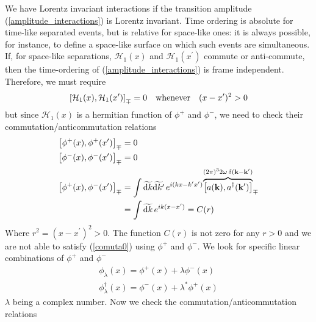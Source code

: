 We have Lorentz invariant interactions if the transition amplitude (\ref{amplitude_interactions}) is Lorentz invariant. Time ordering is absolute for time-like separated events, but is relative for space-like ones: it is always possible, for instance, to define a space-like surface on which such events are simultaneous. If, for space-like separations, $\mathcal{H}_1(x)$ and $\mathcal{H}_1(x^\prime)$ commute or anti-commute, then the time-ordering of (\ref{amplitude_interactions}) is frame independent. Therefore, we must require
\begin{equation}
    \comm{\mathcal{H}_1(x)}{\mathcal{H}_1(x^\prime)}_{\mp}= 0 \quad \text{whenever}\quad (x-x^\prime)^2>0
    \label{comuta0}
\end{equation}
but since $\mathcal{H}_1(x)$ is a hermitian function of $\phi^+$ and $\phi^-$, we need to check their commutation/anticommutation relations
\begin{equation}
    \begin{aligned}
        \comm{\phi^+(x)}{\phi^+(x^\prime)}_{\mp} &=0\\
        \comm{\phi^-(x)}{\phi^-(x^\prime)}_{\mp} &=0\\
        \comm{\phi^+(x)}{\phi^-(x^\prime)}_{\mp} &=\int\widetilde{\dd k}\widetilde{\dd k^\prime}\,e^{i(kx-k^\prime x^\prime)}{\overbrace{\comm{a(\vb{k})}{a^\dagger(\vb{k}^\prime)}}^{(2\pi)^32\omega\,\delta(\vb{k}-\vb{k}^\prime)}}_{\mp}\\
        &=\int\widetilde{\dd k}\,e^{ik(x-x^\prime)}=C(r)
    \end{aligned}
\end{equation}
Where $r^2=(x-x^\prime)^2>0$. The function $C(r)$ is not zero for any $r>0$ and we are not able to satisfy (\ref{comuta0}) using $\phi^+$ and $\phi^-$. We look for specific linear combinations of $\phi^+$ and $\phi^-$
\begin{equation}
\begin{array}{l}
\phi_{\lambda}(x) = \phi^{+}(x)+\lambda \phi^{-}(x) \\
\phi_{\lambda}^{\dagger}(x) = \phi^{-}(x)+\lambda^{*} \phi^{+}(x)
\end{array}
\end{equation}
$\lambda$ being a complex number. Now we check the commutation/anticommutation relations

